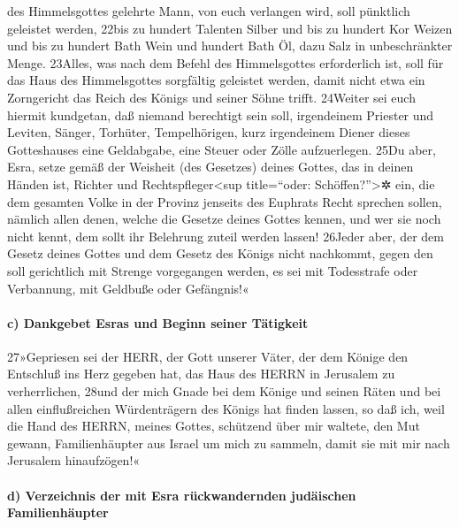 des Himmelsgottes gelehrte Mann, von euch verlangen wird, soll pünktlich
geleistet werden, 22bis zu hundert Talenten Silber und bis zu hundert
Kor Weizen und bis zu hundert Bath Wein und hundert Bath Öl, dazu Salz
in unbeschränkter Menge. 23Alles, was nach dem Befehl des Himmelsgottes
erforderlich ist, soll für das Haus des Himmelsgottes sorgfältig
geleistet werden, damit nicht etwa ein Zorngericht das Reich des Königs
und seiner Söhne trifft. 24Weiter sei euch hiermit kundgetan, daß
niemand berechtigt sein soll, irgendeinem Priester und Leviten, Sänger,
Torhüter, Tempelhörigen, kurz irgendeinem Diener dieses Gotteshauses
eine Geldabgabe, eine Steuer oder Zölle aufzuerlegen. 25Du aber, Esra,
setze gemäß der Weisheit (des Gesetzes) deines Gottes, das in deinen
Händen ist, Richter und Rechtspfleger\textless sup title=``oder:
Schöffen?''\textgreater✲ ein, die dem gesamten Volke in der Provinz
jenseits des Euphrats Recht sprechen sollen, nämlich allen denen, welche
die Gesetze deines Gottes kennen, und wer sie noch nicht kennt, dem
sollt ihr Belehrung zuteil werden lassen! 26Jeder aber, der dem Gesetz
deines Gottes und dem Gesetz des Königs nicht nachkommt, gegen den soll
gerichtlich mit Strenge vorgegangen werden, es sei mit Todesstrafe oder
Verbannung, mit Geldbuße oder Gefängnis!«

\hypertarget{c-dankgebet-esras-und-beginn-seiner-tuxe4tigkeit}{%
\paragraph{c) Dankgebet Esras und Beginn seiner
Tätigkeit}\label{c-dankgebet-esras-und-beginn-seiner-tuxe4tigkeit}}

27»Gepriesen sei der HERR, der Gott unserer Väter, der dem Könige den
Entschluß ins Herz gegeben hat, das Haus des HERRN in Jerusalem zu
verherrlichen, 28und der mich Gnade bei dem Könige und seinen Räten und
bei allen einflußreichen Würdenträgern des Königs hat finden lassen, so
daß ich, weil die Hand des HERRN, meines Gottes, schützend über mir
waltete, den Mut gewann, Familienhäupter aus Israel um mich zu sammeln,
damit sie mit mir nach Jerusalem hinaufzögen!«

\hypertarget{d-verzeichnis-der-mit-esra-ruxfcckwandernden-juduxe4ischen-familienhuxe4upter}{%
\paragraph{d) Verzeichnis der mit Esra rückwandernden judäischen
Familienhäupter}\label{d-verzeichnis-der-mit-esra-ruxfcckwandernden-juduxe4ischen-familienhuxe4upter}}

